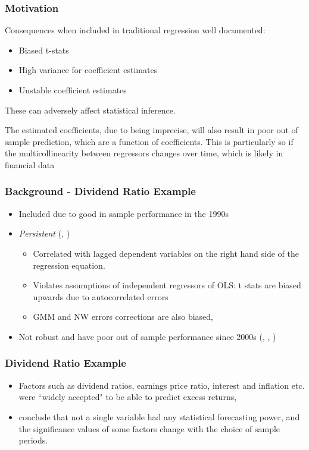\documentclass[aspectratio=169]{beamer}
\begin{document}
\begin{frame}
\frametitle{Motivation}
Consequences when included in traditional regression well documented:
\begin{itemize}
	\item Biased t-stats
	\item High variance for coefficient estimates
	\item Unstable coefficient estimates
\end{itemize}
These can adversely affect statistical inference. 

The estimated coefficients, due to being imprecise, will also result in poor out of sample prediction, which are a function of coefficients. This is particularly so if the multicollinearity between regressors changes over time, which is likely in financial data
\end{frame}

\begin{frame}
\frametitle{Background - Dividend Ratio Example}
\begin{itemize}

\item Included due to good in sample performance in the 1990s \citep{goyal_predicting_2003}

\item \textit{Persistent} (\cite{goetzmann_testing_1993}, \cite{ang_stock_2006})

	\begin{itemize}
	\item Correlated with lagged dependent variables on the right hand side of the regression equation. 
	
	\item Violates assumptions of independent regressors of OLS: t stats are biased upwards due to autocorrelated errors
	
	\item GMM and NW errors corrections are also biased, \citep{goetzmann_testing_1993}
	\end{itemize}

\item Not robust and have poor out of sample performance since 2000s (\cite{goyal_predicting_2003}, \cite{lettau_consumption_2001}, \cite{schwert_anomalies_2003})
\end{itemize}
\end{frame}

\begin{frame}
\frametitle{Dividend Ratio Example}
\begin{itemize}
\item Factors such as dividend ratios, earnings price ratio, interest and inflation etc. were ``widely accepted" to be able to predict excess returns, \citep{lettau_consumption_2001}

\item \cite{welch_comprehensive_2008} conclude that not a single variable had any statistical forecasting power, and the significance values of some factors change with the choice of sample periods.
\end{itemize}
\end{frame}
\end{document}
